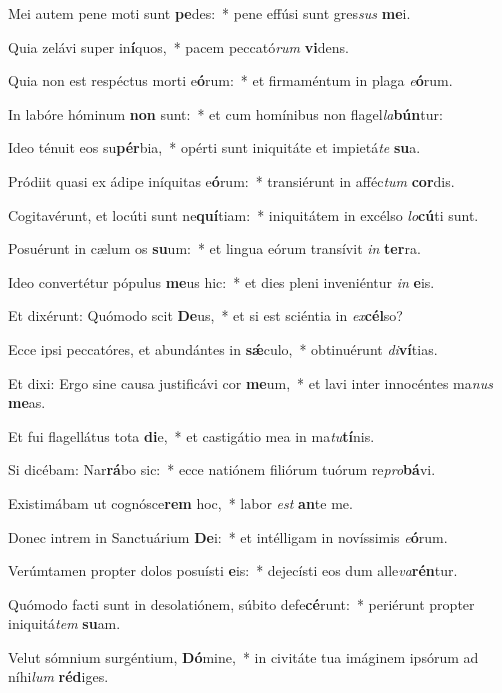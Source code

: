 \item Mei autem pene moti sunt \textbf{pe}des:~* pene effúsi sunt gres\textit{sus} \textbf{me}i.
\item Quia zelávi super in\textbf{í}quos,~* pacem peccató\textit{rum} \textbf{vi}dens.
\item Quia non est respéctus morti e\textbf{ó}rum:~* et firmaméntum in plaga \textit{e}\textbf{ó}rum.
\item In labóre hóminum \textbf{non} sunt:~* et cum homínibus non flagel\textit{la}\textbf{bún}tur:
\item Ideo ténuit eos su\textbf{pér}bia,~* opérti sunt iniquitáte et impietá\textit{te} \textbf{su}a.
\item Pródiit quasi ex ádipe iníquitas e\textbf{ó}rum:~* transiérunt in afféc\textit{tum} \textbf{cor}dis.
\item Cogitavérunt, et locúti sunt ne\textbf{quí}tiam:~* iniquitátem in excélso \textit{lo}\textbf{cú}ti sunt.
\item Posuérunt in cælum os \textbf{su}um:~* et lingua eórum transívit \textit{in} \textbf{ter}ra.
\item Ideo convertétur pópulus \textbf{me}us hic:~* et dies pleni inveniéntur \textit{in} \textbf{e}is.
\item Et dixérunt: Quómodo scit \textbf{De}us,~* et si est sciéntia in \textit{ex}\textbf{cél}so?
\item Ecce ipsi peccatóres, et abundántes in \textbf{sǽ}culo,~* obtinuérunt \textit{di}\textbf{ví}tias.
\item Et dixi: Ergo sine causa justificávi cor \textbf{me}um,~* et lavi inter innocéntes ma\textit{nus} \textbf{me}as.
\item Et fui flagellátus tota \textbf{di}e,~* et castigátio mea in ma\textit{tu}\textbf{tí}nis.
\item Si dicébam: Nar\textbf{rá}bo sic:~* ecce natiónem filiórum tuórum re\textit{pro}\textbf{bá}vi.
\item Existimábam ut cognósce\textbf{rem} hoc,~* labor \textit{est} \textbf{an}te me.
\item Donec intrem in Sanctuárium \textbf{De}i:~* et intélligam in novíssimis \textit{e}\textbf{ó}rum.
\item Verúmtamen propter dolos posuísti \textbf{e}is:~* dejecísti eos dum alle\textit{va}\textbf{rén}tur.
\item Quómodo facti sunt in desolatiónem, súbito defe\textbf{cé}runt:~* periérunt propter iniquitá\textit{tem} \textbf{su}am.
\item Velut sómnium surgéntium, \textbf{Dó}mine,~* in civitáte tua imáginem ipsórum ad níhi\textit{lum} \textbf{réd}iges.
